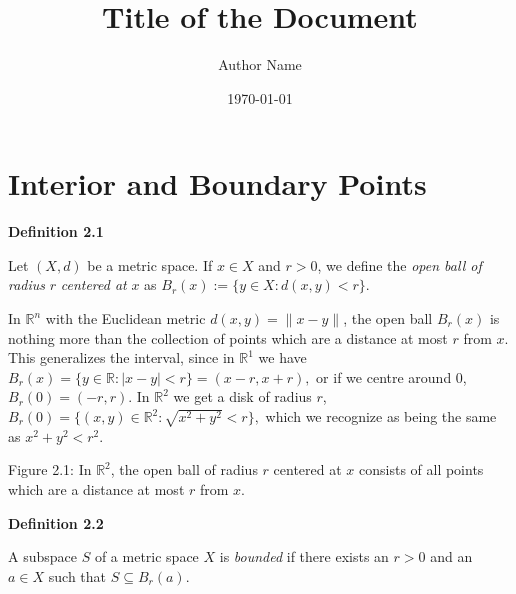 \documentclass{article}
\title{\textbf{Title of the Document}}
\author{Author Name}
\date{\today}
\theoremstyle{definition}
\numberwithin{equation}{section}
\begin{document}
\maketitle
\tableofcontents
\newpage
\section{Interior and Boundary Points}

\begin{mydefbox}
\textbf{Definition 2.1}

Let $(X,d)$ be a metric space. If $x \in X$ and $r > 0$, we define the \emph{open ball of radius} $r$ \emph{centered at} $x$ as 
$
    B_r(x) := \{y \in X : d(x,y) < r\}.
$
\end{mydefbox}

In $\mathbb{R}^n$ with the Euclidean metric $d(x,y) = \|x - y\|$, the open ball $B_r(x)$ is nothing more than the collection of points which are a distance at most $r$ from $x$. This generalizes the interval, since in $\mathbb{R}^1$ we have 
$
    B_r(x) = \{y \in \mathbb{R} : |x - y| < r\} = (x - r, x + r),
$
or if we centre around $0$, $B_r(0) = (-r, r)$. In $\mathbb{R}^2$ we get a disk of radius $r$, 
$
    B_r(0) = \{(x, y) \in \mathbb{R}^2 : \sqrt{x^2 + y^2} < r\},
$
which we recognize as being the same as $x^2 + y^2 < r^2$. 

\begin{center}

Figure 2.1: In $\mathbb{R}^2$, the open ball of radius $r$ centered at $x$ consists of all points which are a distance at most $r$ from $x$.
\end{center}

\begin{mydefbox}
\textbf{Definition 2.2}

A subspace $S$ of a metric space $X$ is \emph{bounded} if there exists an $r > 0$ and an $a \in X$ such that $S \subseteq B_r(a)$.
\end{mydefbox}
\end{document}
